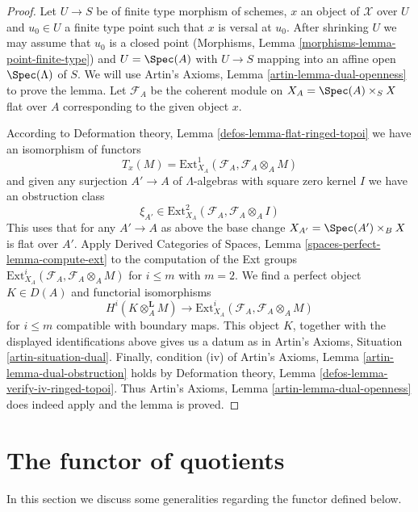 \begin{proof}
Let $U \to S$ be of finite type morphism of schemes, $x$ an object of
$\mathcal{X}$ over $U$ and $u_0 \in U$ a finite type point such that
$x$ is versal at $u_0$. After shrinking $U$ we may assume that $u_0$
is a closed point (Morphisms, Lemma \ref{morphisms-lemma-point-finite-type})
and $U = \Spec(A)$ with $U \to S$ mapping into an
affine open $\Spec(\Lambda)$ of $S$. We will use
Artin's Axioms, Lemma \ref{artin-lemma-dual-openness} to prove the lemma.
Let $\mathcal{F}_A$ be the coherent module on $X_A = \Spec(A) \times_S X$
flat over $A$ corresponding to the given object $x$.

\medskip\noindent
According to Deformation theory, Lemma \ref{defos-lemma-flat-ringed-topoi}
we have an isomorphism of functors
$$
T_x(M) = \text{Ext}^1_{X_A}(\mathcal{F}_A, \mathcal{F}_A \otimes_A M)
$$
and given any surjection $A' \to A$ of $\Lambda$-algebras with square zero
kernel $I$ we have an obstruction class
$$
\xi_{A'} \in \text{Ext}^2_{X_A}(\mathcal{F}_A, \mathcal{F}_A \otimes_A I)
$$
This uses that for any $A' \to A$ as above the base change
$X_{A'} = \Spec(A') \times_B X$ is flat over $A'$.
Apply Derived Categories of Spaces, Lemma
\ref{spaces-perfect-lemma-compute-ext}
to the computation of the Ext groups
$\text{Ext}^i_{X_A}(\mathcal{F}_A, \mathcal{F}_A \otimes_A M)$
for $i \leq m$ with $m = 2$. We find a perfect object $K \in D(A)$
and functorial isomorphisms
$$
H^i(K \otimes_A^\mathbf{L} M)
\longrightarrow
\text{Ext}^i_{X_A}(\mathcal{F}_A, \mathcal{F}_A \otimes_A M)
$$
for $i \leq m$ compatible with boundary maps. This object $K$, together
with the displayed identifications above gives us a datum as in
Artin's Axioms, Situation \ref{artin-situation-dual}.
Finally, condition (iv) of
Artin's Axioms, Lemma \ref{artin-lemma-dual-obstruction}
holds by 
Deformation theory, Lemma \ref{defos-lemma-verify-iv-ringed-topoi}.
Thus Artin's Axioms, Lemma \ref{artin-lemma-dual-openness}
does indeed apply and the lemma is proved.
\end{proof}








\section{The functor of quotients}
\label{section-functor-quotients}

\noindent
In this section we discuss some generalities regarding the functor
defined below.

